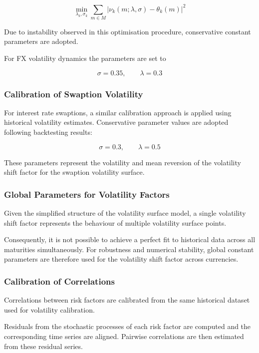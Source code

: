 \begin{equation}
	\min_{\lambda_k,\sigma_k}
	\sum_{m\in M}
	\left|
	\nu_k(m;\lambda,\sigma) - \theta_k(m)
	\right|^2
\end{equation}

Due to instability observed in this optimisation procedure, conservative constant parameters are adopted.

For FX volatility dynamics the parameters are set to

\[
\sigma = 0.35, \qquad \lambda = 0.3
\]

\subsubsection{Calibration of Swaption Volatility}

For interest rate swaptions, a similar calibration approach is applied using historical volatility estimates. Conservative parameter values are adopted following backtesting results:

\[
\sigma = 0.3, \qquad \lambda = 0.5
\]

These parameters represent the volatility and mean reversion of the volatility shift factor for the swaption volatility surface.

\subsubsection{Global Parameters for Volatility Factors}

Given the simplified structure of the volatility surface model, a single volatility shift factor represents the behaviour of multiple volatility surface points.

Consequently, it is not possible to achieve a perfect fit to historical data across all maturities simultaneously. For robustness and numerical stability, global constant parameters are therefore used for the volatility shift factor across currencies.

\subsubsection{Calibration of Correlations}

Correlations between risk factors are calibrated from the same historical dataset used for volatility calibration.

Residuals from the stochastic processes of each risk factor are computed and the corresponding time series are aligned. Pairwise correlations are then estimated from these residual series.

